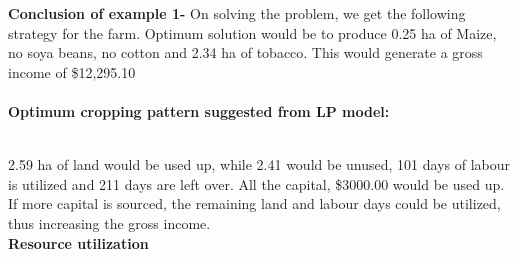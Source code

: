 \documentclass[conference]{IEEEtran}
\begin{document}
\textbf{Conclusion of example 1-}
On solving the problem, we get the following strategy for the farm. Optimum solution would be to produce 0.25 ha of Maize, no soya beans, no cotton and 2.34 ha of tobacco. This would generate a gross income of \$12,295.10
\\\\
\textbf{Optimum cropping pattern suggested from LP model:}
\vspace{-0.5cm}
\begin{table}[h!]
    \centering
    \small
    \setlength\tabcolsep{1pt}
\end{table}
\\
2.59 ha of land would be used up, while 2.41 would be unused, 101 days of labour is utilized and 211 days are left over. All the capital, \$3000.00 would be used up. If more capital is sourced, the remaining land and labour days could be utilized, thus increasing the gross income.
\\
\textbf{Resource utilization}
\end{document}
